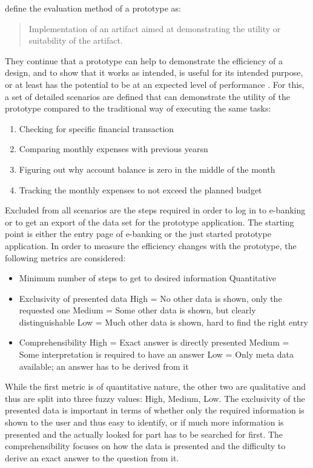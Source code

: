 \newcommand{\scenone}{Checking for specific financial transaction}
\newcommand{\scentwo}{Comparing monthly expenses with previous yearsn}
\newcommand{\scenthree}{Figuring out why  account balance is zero in the middle of the month}
\newcommand{\scenfour}{Tracking the monthly expenses to not exceed the planned budget}

\citet[p.4]{Peffers2012} define the evaluation method of a prototype as: \blockquote{Implementation of an artifact aimed at demonstrating the utility or suitability of the artifact.} They continue that a prototype can help to demonstrate the efficiency of a design, and to show that it works as intended, is useful for its intended purpose, or at least has the potential to be at an expected level of performance \citep{Peffers2012}. For this, a set of detailed scenarios are defined that can demonstrate the utility of the prototype compared to the traditional way of executing the same tasks:
\begin{enumerate}
	\item \scenone
	\item \scentwo
	\item \scenthree
	\item \scenfour
\end{enumerate}
Excluded from all scenarios are the steps required in order to log in to e-banking or to get an export of the data set for the prototype application. The starting point is either the entry page of e-banking or the just started prototype application. In order to measure the efficiency changes with the prototype, the following metrics are considered:
\begin{itemize}[noitemsep,nolistsep]
	\item Minimum number of steps to get to desired information
		\subitem Quantitative
	\item Exclusivity of presented data
		\subitem High = No other data is shown, only the requested one
		\subitem Medium = Some other data is shown, but clearly distinguishable
		\subitem Low = Much other data is shown, hard to find the right entry
	\item Comprehensibility
		\subitem High = Exact answer is directly presented
		\subitem Medium = Some interpretation is required to have an answer
		\subitem Low = Only meta data available; an answer has to be derived from it
\end{itemize}
While the first metric is of quantitative nature, the other two are qualitative and thus are split into three fuzzy values: High, Medium, Low. The exclusivity of the presented data is important in terms of whether only the required information is shown to the user and thus easy to identify, or if much more information is presented and the actually looked for part has to be searched for first. The comprehensibility focuses on how the data is presented and the difficulty to derive an exact answer to the question from it. \newline
